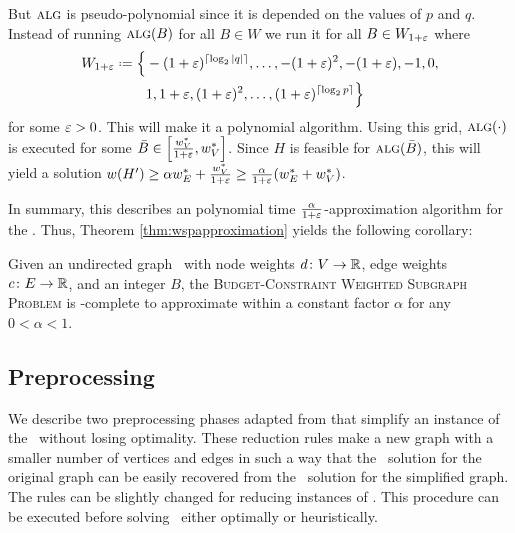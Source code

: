 But $\textsc{alg}$ is pseudo-polynomial since it is depended on the values of $p$ and $q$. Instead of running $\textsc{alg}(B)$ for all $B \in W$ we run it for all $B \in W_{1+\varepsilon}$ where
\begin{align*}
	W_{1+\eps} \defeq \Big\{&-(1 + \eps)^{\lceil \log_2 |q| \rceil}, \ldots, -(1+\eps)^2, -(1+\eps), -1, 0,\\
	&1, 1+\eps, (1+\eps)^2, \ldots, (1+\eps)^{\lceil \log_2 p \rceil} \Big\}
\end{align*}
for some $\varepsilon > 0$. This will make it a polynomial algorithm. Using this grid, $\textsc{alg}(\cdot)$ is executed for some $\bar{B} \in \left[\frac{w_V^*}{1+\varepsilon}, w_V^*\right]$. Since $H$ is feasible for $\textsc{alg}(\bar{B})$, this will yield a solution $w(H') \geq \alpha w_E^* + \frac{w_V^*}{1+\varepsilon} \geq \frac{\alpha}{1 + \varepsilon} (w_E^* + w_V^*)$.\medskip

In summary, this describes an polynomial time $\frac{\alpha}{1 + \varepsilon}$-approximation algorithm for the \WSP. Thus, Theorem \ref{thm:wspapproximation} yields the following corollary:

\begin{corollary}
	\label{corollary:wspbudgetapproximation}
	Given an undirected graph \ugraph\ with node weights $d \colon V \to \mathbb{R}$, edge weights $c \colon E \to \mathbb{R}$, and an integer $B$, the \textsc{Budget-Constraint Weighted Subgraph Problem} is \NP-complete to approximate within a constant factor $\alpha$ for any $0 < \alpha < 1$.
\end{corollary}


\subsection{Preprocessing}
\label{sec:approximation:preprocess}

We describe two preprocessing phases adapted from \cite{EK14} that simplify an instance of the \WSP\ without losing optimality. These reduction rules make a new graph with a smaller number of vertices and edges in such a way that the \maxWSP\ solution for the original graph can be easily recovered from the \maxWSP\ solution for the simplified graph. The rules can be slightly changed for reducing instances of \minWSP. This procedure can be executed before solving \maxWSP\ either optimally or heuristically.\medskip

